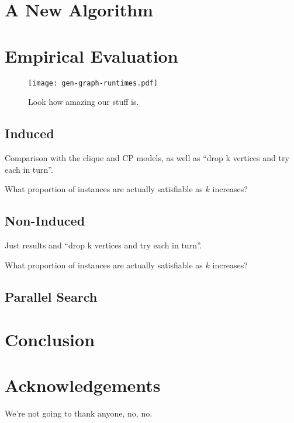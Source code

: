 \documentclass[letterpaper]{article}
\theoremstyle{definition}
\begin{document}
\section{A New Algorithm}

\section{Empirical Evaluation}

\begin{figure}
    \texttt{[image: gen-graph-runtimes.pdf]}
    \caption{Look how amazing our stuff is.}\label{figure:runtimes}
\end{figure}

\subsection{Induced}

Comparison with the clique and CP models, as well as ``drop k vertices and try each in turn''.

What proportion of instances are actually satisfiable as $k$ increases?

\subsection{Non-Induced}

Just results and ``drop k vertices and try each in turn''.

What proportion of instances are actually satisfiable as $k$ increases?

\subsection{Parallel Search}

\section{Conclusion}

\section*{Acknowledgements}

We're not going to thank anyone, no, no.



\end{document}
